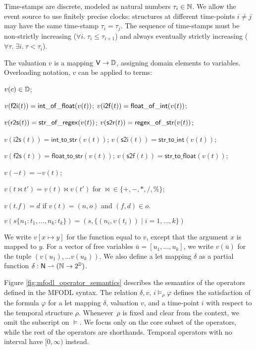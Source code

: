 Time-stamps are discrete, modeled as natural numbers \(\tau_i \in \mathbb{N}\). We allow the event source to use finitely precise clocks:
structures at different time-points $i \neq j$ may have the same time-stamp $\tau_i = \tau_j$. The sequence of time-stamps must be non-strictly increasing ($\forall i.\;\tau_i \leq \tau_{i+1}$) and always eventually strictly increasing ($\forall \tau.\;\exists i.\ \tau < \tau_i$).

The valuation \(v\) is a mapping \(\mathsf{V} \to \mathbb{D}\), assigning domain elements to variables. Overloading notation, $v$ can be applied to terms:
\begin{compactitem}
	\item $v(c)\in \mathbb{D}$;
	\item $v(\mathsf{f2i}(t))=\mathsf{int\_of\_float}(v(t))$; $v(\mathsf{i2f}(t))=\mathsf{float\_of\_int}(v(t))$;
	\item $v(\mathsf{r2s}(t))=\mathsf{str\_of\_regex}(v(t))$; $v(\mathsf{s2r}(t))=\mathsf{regex\_of\_str}(v(t))$;
	\item $v(\mathsf{i2s}(t))=\mathsf{int\_to\_str}(v(t))$; $v(\mathsf{s2i}(t))=\mathsf{str\_to\_int}(v(t))$;
	\item $v(\mathsf{f2s}(t))=\mathsf{float\_to\_str}(v(t))$; $v(\mathsf{s2f}(t))=\mathsf{str\_to\_float}(v(t))$;
	\item $v(-t)=-v(t)$;
	\item $v(t\bowtie t')=v(t)\bowtie v(t')$ for $\bowtie\in \{+,-,*,/,\%\}$;
	\item $v(t.f) = d$ if $v(t) = (n,o)$ and $(f,d)\in o$.
	\item $v(s\{n_1:t_1,\ldots,n_k:t_k\}) = (s,\{(n_i,v(t_i)) \mid i = 1,\ldots, k\})$
\end{compactitem}

We write \(v[x \mapsto y]\) for the function equal to \(v\), except that the argument \(x\) is mapped to \(y\). For a vector of free variables $\bar{u}=[u_1,\ldots,u_k]$, we write \(v(\bar{u})\) for the tuple \((v(u_1),\ldots v(u_k))\). We also define a let mapping $\delta$ as a partial function $\delta:\mathsf{N} \rightharpoonup (\mathbb{N} \rightarrow 2^{\mathbb{D}})$.

Figure \ref{fig:mfodl_operator_semantics} describes the semantics of the operators defined in the MFODL syntax. The relation \(\delta, v,\,i \models_\rho \varphi\) defines the satisfaction of the formula \(\varphi\) for a let mapping $\delta$, valuation $v$, and a time-point \(i\) with respect to the temporal structure $\rho$. Whenever~$\rho$ is fixed and clear from the context, we omit the subscript on $\models$. We focus only on the core subset of the operators, while the rest of the operators are shorthands. Temporal operators with no interval have $[0,\infty)$ instead.

